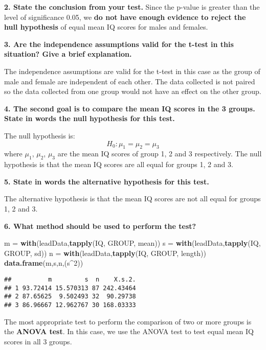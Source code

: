 \documentclass[
]{article}
\newenvironment{Shaded}{\begin{snugshade}}{\end{snugshade}}
\newcommand{\DecValTok}[1]{\textcolor[rgb]{0.00,0.00,0.81}{#1}}
\newcommand{\KeywordTok}[1]{\textcolor[rgb]{0.13,0.29,0.53}{\textbf{#1}}}
\newcommand{\NormalTok}[1]{#1}
\newcommand{\OperatorTok}[1]{\textcolor[rgb]{0.81,0.36,0.00}{\textbf{#1}}}
\newcommand{\StringTok}[1]{\textcolor[rgb]{0.31,0.60,0.02}{#1}}
\begin{document}
\textbf{2. State the conclusion from your test.} Since the p-value is
greater than the level of significance 0.05, we \textbf{do not have
enough evidence to reject the hull hypothesis} of equal mean IQ scores
for males and females.

\textbf{3. Are the independence assumptions valid for the t-test in this
situation? Give a brief explanation.}

The independence assumptions are valid for the t-test in this case as
the group of male and female are independent of each other. The data
collected is not paired so the data collected from one group would not
have an effect on the other group.

\textbf{4. The second goal is to compare the mean IQ scores in the 3
groups. State in words the null hypothesis for this test.}

The null hypothesis is: \[H_0: \mu_1 = \mu_2 = \mu_3\] where \(\mu_1\),
\(\mu_2\), \(\mu_3\) are the mean IQ scores of group 1, 2 and 3
respectively. The null hypothesis is that the mean IQ scores are all
equal for groups 1, 2 and 3.

\textbf{5. State in words the alternative hypothesis for this test.}

The alternative hypothesis is that the mean IQ scores are not all equal
for groups 1, 2 and 3.

\textbf{6. What method should be used to perform the test?}

\begin{Shaded}
\begin{Highlighting}[]
\NormalTok{m =}\StringTok{ }\KeywordTok{with}\NormalTok{(leadData,}\KeywordTok{tapply}\NormalTok{(IQ, GROUP, mean))}
\NormalTok{s =}\StringTok{ }\KeywordTok{with}\NormalTok{(leadData,}\KeywordTok{tapply}\NormalTok{(IQ, GROUP, sd))}
\NormalTok{n =}\StringTok{ }\KeywordTok{with}\NormalTok{(leadData,}\KeywordTok{tapply}\NormalTok{(IQ, GROUP, length))}
\KeywordTok{data.frame}\NormalTok{(m,s,n,(s}\OperatorTok{^}\DecValTok{2}\NormalTok{))}
\end{Highlighting}
\end{Shaded}

\begin{verbatim}
##          m         s  n    X.s.2.
## 1 93.72414 15.570313 87 242.43464
## 2 87.65625  9.502493 32  90.29738
## 3 86.96667 12.962767 30 168.03333
\end{verbatim}

The most appropriate test to perform the comparison of two or more
groups is the \textbf{ANOVA test}. In this case, we use the ANOVA test
to test equal mean IQ scores in all 3 groups.
\end{document}
